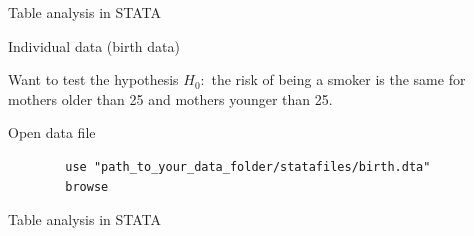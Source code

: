 \documentclass[compress, notes=hide]{beamer}
\begin{document}
\begin{frame}[fragile]{Table analysis in STATA}
	\begin{block}{Individual data (birth data)}
	
	Want to test the hypothesis $H_0:$ the risk of being a smoker is the same for mothers older than 25 and mothers younger than 25. 
	
	\vspace{0.2cm}
	
	Open data file 
	
	\begin{verbatim}
		use "path_to_your_data_folder/statafiles/birth.dta"
		browse
	\end{verbatim}


	\end{block}
\end{frame}

\begin{frame}[fragile]{Table analysis in STATA}
		\begin{figure}[H]
	\begin{center}
		{}
	\end{center}
\end{figure}
\end{frame}
\end{document}
